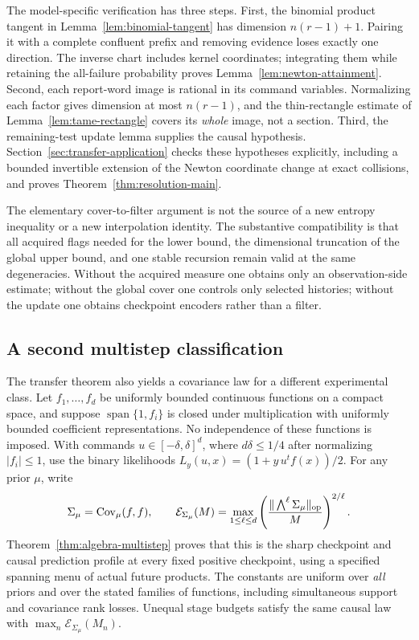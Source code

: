 The model-specific verification has three steps. First, the binomial
product tangent in Lemma~\ref{lem:binomial-tangent} has dimension
$n(r-1)+1$. Pairing it with a complete confluent prefix and removing
evidence loses exactly one direction. The inverse chart includes
kernel coordinates; integrating them while retaining the all-failure
probability proves Lemma~\ref{lem:newton-attainment}. Second, each
report-word image is rational in its command variables. Normalizing
each factor gives dimension at most $n(r-1)$, and the
thin-rectangle estimate of Lemma~\ref{lem:tame-rectangle} covers its
\emph{whole} image, not a section. Third, the remaining-test update
lemma supplies the causal hypothesis. Section~\ref{sec:transfer-application}
checks these hypotheses explicitly, including a bounded invertible
extension of the Newton coordinate change at exact collisions, and
proves Theorem~\ref{thm:resolution-main}.

The elementary cover-to-filter argument is not the source of a new
entropy inequality or a new interpolation identity. The substantive
compatibility is that all acquired flags needed for the lower bound,
the dimensional truncation of the global upper bound, and one stable
recursion remain valid at the same degeneracies. Without the acquired
measure one obtains only an observation-side estimate; without the
global cover one controls only selected histories; without the update
one obtains checkpoint encoders rather than a filter.

\subsection{A second multistep classification}
The transfer theorem also yields a covariance law for a different
experimental class. Let $f_1,\ldots,f_d$ be uniformly bounded continuous
functions on a compact space, and suppose $\operatorname{span}\{1,f_i\}$
is closed under multiplication with uniformly bounded coefficient
representations. No independence of these functions is imposed. With
commands $u\in[-\delta,\delta]^d$, where $d\delta\le1/4$ after
normalizing $|f_i|\le1$, use the binary likelihoods
$L_y(u,x)=(1+y\,u^tf(x))/2$. For any prior $\mu$, write
\[
 \Sigma_\mu=\operatorname{Cov}_\mu(f,f),\qquad
 \mathcal E_{\Sigma_\mu}(M)=
 \max_{1\le\ell\le d}
 \left(\frac{\|\bigwedge^\ell\Sigma_\mu\|_{\rm op}}{M}\right)^{2/\ell}.
\]
Theorem~\ref{thm:algebra-multistep} proves that this is the sharp
checkpoint and causal prediction profile at every fixed positive
checkpoint, using a specified spanning menu of actual future products.
The constants are uniform over \emph{all} priors and over the stated
families of functions, including simultaneous support and covariance
rank losses. Unequal stage budgets satisfy the same causal law with
$\max_n\mathcal E_{\Sigma_\mu}(M_n)$.

